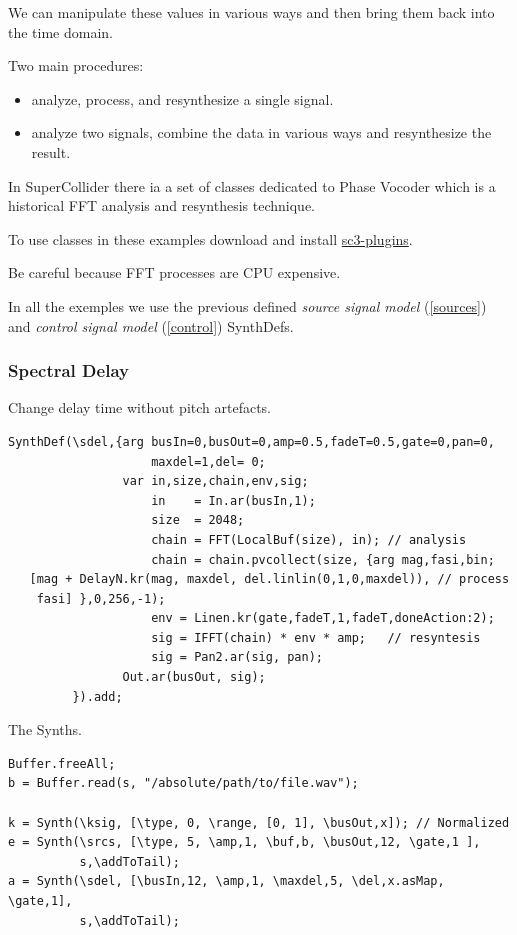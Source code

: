 We can manipulate these values in various ways and then bring them back into the time domain.

Two main procedures:

\begin{itemize}
\tightlist 
\item analyze, process, and resynthesize a single signal. 
\item analyze two signals, combine the data in various ways and resynthesize the result.
\end{itemize}

In SuperCollider there ia a set of classes dedicated to Phase Vocoder which is a historical FFT analysis and resynthesis technique.

To use classes in these examples download and install \href{https://supercollider.github.io/sc3-plugins/}{sc3-plugins}.

Be careful because FFT processes are CPU expensive.

In all the exemples we use the previous defined \textit{source signal model} (\ref{sources}) and \textit{control signal model} (\ref{control}) SynthDefs.

\subsubsection{Spectral Delay}\label{spectral-delay}

Change delay time without pitch artefacts.

\begin{lstlisting}[frame=single,caption=Spectral Delay model] 
SynthDef(\sdel,{arg busIn=0,busOut=0,amp=0.5,fadeT=0.5,gate=0,pan=0,
                    maxdel=1,del= 0;
                var in,size,chain,env,sig;
                    in    = In.ar(busIn,1);
                    size  = 2048;
                    chain = FFT(LocalBuf(size), in); // analysis
                    chain = chain.pvcollect(size, {arg mag,fasi,bin;  
   [mag + DelayN.kr(mag, maxdel, del.linlin(0,1,0,maxdel)), // process 
    fasi] },0,256,-1);
                    env = Linen.kr(gate,fadeT,1,fadeT,doneAction:2);
                    sig = IFFT(chain) * env * amp;   // resyntesis
                    sig = Pan2.ar(sig, pan);
                Out.ar(busOut, sig);
         }).add;
\end{lstlisting}

The Synths.

\begin{lstlisting}[frame=single] 
Buffer.freeAll;
b = Buffer.read(s, "/absolute/path/to/file.wav");

k = Synth(\ksig, [\type, 0, \range, [0, 1], \busOut,x]); // Normalized
e = Synth(\srcs, [\type, 5, \amp,1, \buf,b, \busOut,12, \gate,1 ],
          s,\addToTail);
a = Synth(\sdel, [\busIn,12, \amp,1, \maxdel,5, \del,x.asMap, \gate,1],
          s,\addToTail);
\end{lstlisting}

